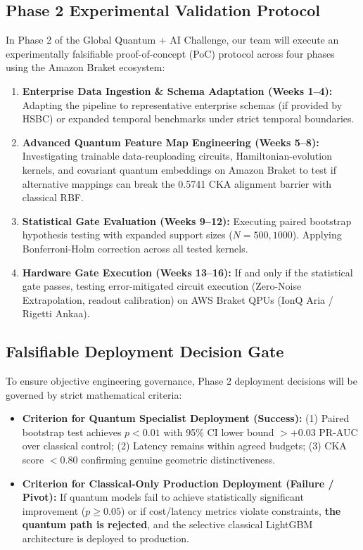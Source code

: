 \documentclass[10pt,a4paper]{article}
\begin{document}
\subsection{Phase 2 Experimental Validation Protocol}
In Phase 2 of the Global Quantum + AI Challenge, our team will execute an experimentally falsifiable proof-of-concept (PoC) protocol across four phases using the Amazon Braket ecosystem:
\begin{enumerate}[leftmargin=*,itemsep=0.1pt,topsep=0.5pt]
\item \textbf{Enterprise Data Ingestion \& Schema Adaptation (Weeks 1--4):} Adapting the pipeline to representative enterprise schemas (if provided by HSBC) or expanded temporal benchmarks under strict temporal boundaries.
\item \textbf{Advanced Quantum Feature Map Engineering (Weeks 5--8):} Investigating trainable data-reuploading circuits, Hamiltonian-evolution kernels, and covariant quantum embeddings on Amazon Braket to test if alternative mappings can break the 0.5741 CKA alignment barrier with classical RBF.
\item \textbf{Statistical Gate Evaluation (Weeks 9--12):} Executing paired bootstrap hypothesis testing with expanded support sizes ($N=500, 1000$). Applying Bonferroni-Holm correction across all tested kernels.
\item \textbf{Hardware Gate Execution (Weeks 13--16):} If and only if the statistical gate passes, testing error-mitigated circuit execution (Zero-Noise Extrapolation, readout calibration) on AWS Braket QPUs (IonQ Aria / Rigetti Ankaa).
\end{enumerate}

\subsection{Falsifiable Deployment Decision Gate}
To ensure objective engineering governance, Phase 2 deployment decisions will be governed by strict mathematical criteria:
\begin{itemize}[leftmargin=*,itemsep=0.1pt,topsep=0.5pt]
\item \textbf{Criterion for Quantum Specialist Deployment (Success):} (1) Paired bootstrap test achieves $p < 0.01$ with 95\% CI lower bound $> +0.03$ PR-AUC over classical control; (2) Latency remains within agreed budgets; (3) CKA score $< 0.80$ confirming genuine geometric distinctiveness.
\item \textbf{Criterion for Classical-Only Production Deployment (Failure / Pivot):} If quantum models fail to achieve statistically significant improvement ($p \ge 0.05$) or if cost/latency metrics violate constraints, \textbf{the quantum path is rejected}, and the selective classical LightGBM architecture is deployed to production.
\end{itemize}
\end{document}
